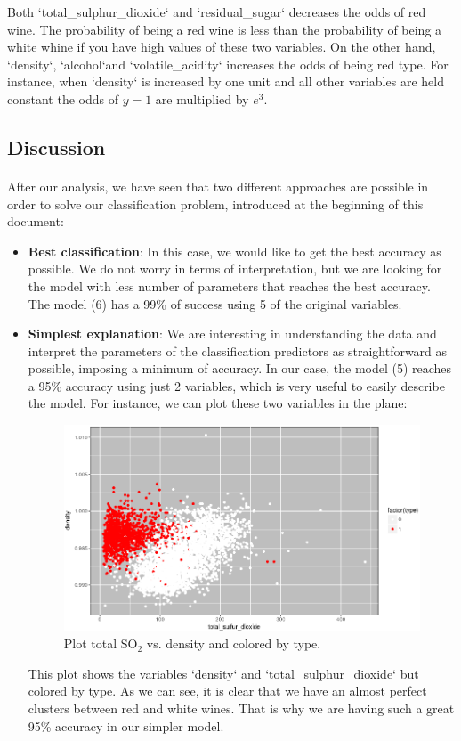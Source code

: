 \documentclass[10pt]{article}
\begin{document}
Both `total\_sulphur\_dioxide` and `residual\_sugar` decreases the odds of red wine. The probability of being a red wine is less than the probability of being a white whine if you have high values of these two variables. On the other hand, `density`, `alcohol`and `volatile\_acidity` increases the odds of being red type. For instance, when `density` is increased by one unit and all other variables are held constant the odds of $y = 1$ are multiplied by $e^{3}$.

\subsection{Discussion}

\paragraph*{}
After our analysis, we have seen that two different approaches are possible in order to solve our classification problem, introduced at the beginning of this document:

\begin{itemize}
	\item \textbf{Best classification}: In this case, we would like to get the best accuracy as possible. We do not worry in terms of interpretation, but we are looking for the model with less number of parameters that reaches the best accuracy. The model (6) has a 99\% of success using 5 of the original variables. 
	\item \textbf{Simplest explanation}: We are interesting in understanding the data and interpret the parameters of the classification predictors as straightforward as possible, imposing a minimum of accuracy. In our case, the model (5) reaches a 95\% accuracy using just 2 variables, which is very useful to easily describe the model. For instance, we can plot these two variables in the plane:
	
	\begin{figure}[H]
		\centering
		\includegraphics[width=5in]{figures/cluster.png} 
		\caption{Plot total SO$_2$ vs. density and colored by type.}
		\label{figure:cluster}
	\end{figure}
	
	This plot shows the variables `density` and `total\_sulphur\_dioxide` but colored by type. As we can see, it is clear that we have an almost perfect clusters between red and white wines. That is why we are having such a great 95\% accuracy in our simpler model. 
\end{itemize}
\end{document}
